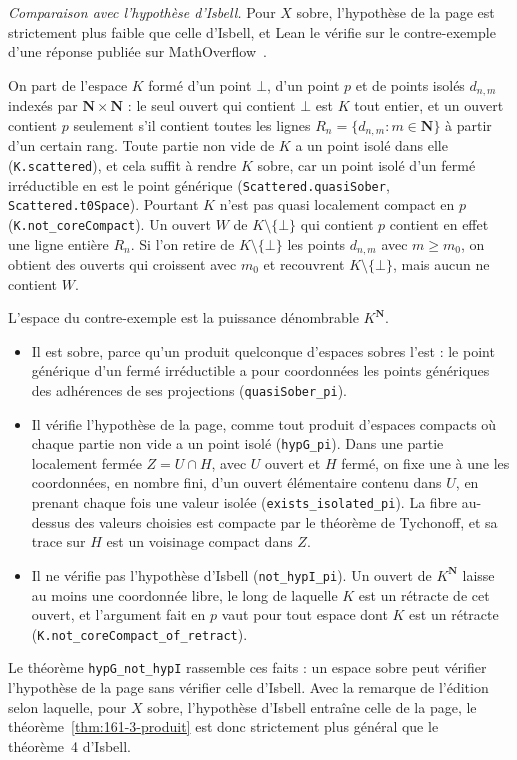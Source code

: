 \noindent\emph{Comparaison avec l'hypothèse d'Isbell.} Pour $X$ sobre, l'hypothèse de la page est strictement plus faible que celle d'Isbell, et Lean le vérifie sur le contre-exemple d'une réponse publiée sur MathOverflow~\cite{mo516361}.

On part de l'espace $K$ formé d'un point $\bot$, d'un point $p$ et de points isolés $d_{n,m}$ indexés par $\mathbf N \times \mathbf N$ : le seul ouvert qui contient $\bot$ est $K$ tout entier, et un ouvert contient $p$ seulement s'il contient toutes les lignes $R_n = \{d_{n,m} : m \in \mathbf N\}$ à partir d'un certain rang. Toute partie non vide de $K$ a un point isolé dans elle (\texttt{K.\allowbreak{}scattered}), et cela suffit à rendre $K$ sobre, car un point isolé d'un fermé irréductible en est le point générique (\texttt{Scattered.\allowbreak{}quasiSober}, \texttt{Scattered.\allowbreak{}t0Space}). Pourtant $K$ n'est pas quasi localement compact en $p$ (\texttt{K.\allowbreak{}not\_coreCompact}). Un ouvert $W$ de $K \setminus \{\bot\}$ qui contient $p$ contient en effet une ligne entière $R_n$. Si l'on retire de $K \setminus \{\bot\}$ les points $d_{n,m}$ avec $m \geq m_0$, on obtient des ouverts qui croissent avec $m_0$ et recouvrent $K \setminus \{\bot\}$, mais aucun ne contient $W$.

L'espace du contre-exemple est la puissance dénombrable $K^{\mathbf N}$.
\begin{itemize}
\item Il est sobre, parce qu'un produit quelconque d'espaces sobres l'est \cite{gierz2003} : le point générique d'un fermé irréductible a pour coordonnées les points génériques des adhérences de ses projections (\texttt{quasiSober\_pi}).
\item Il vérifie l'hypothèse de la page, comme tout produit d'espaces compacts où chaque partie non vide a un point isolé (\texttt{hypG\_pi}). Dans une partie localement fermée $Z = U \cap H$, avec $U$ ouvert et $H$ fermé, on fixe une à une les coordonnées, en nombre fini, d'un ouvert élémentaire contenu dans $U$, en prenant chaque fois une valeur isolée (\texttt{exists\_isolated\_pi}). La fibre au-dessus des valeurs choisies est compacte par le théorème de Tychonoff, et sa trace sur $H$ est un voisinage compact dans $Z$.
\item Il ne vérifie pas l'hypothèse d'Isbell (\texttt{not\_hypI\_pi}). Un ouvert de $K^{\mathbf N}$ laisse au moins une coordonnée libre, le long de laquelle $K$ est un rétracte de cet ouvert, et l'argument fait en $p$ vaut pour tout espace dont $K$ est un rétracte (\texttt{K.\allowbreak{}not\_coreCompact\_of\_retract}).
\end{itemize}
Le théorème \texttt{hypG\_not\_hypI} rassemble ces faits : un espace sobre peut vérifier l'hypothèse de la page sans vérifier celle d'Isbell. Avec la remarque de l'édition selon laquelle, pour $X$ sobre, l'hypothèse d'Isbell entraîne celle de la page, le théorème~\ref{thm:161-3-produit} est donc strictement plus général que le théorème~4 d'Isbell.

